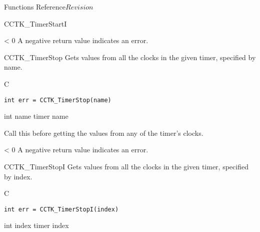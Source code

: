 \begin{cactuspart}{ Functions Reference}{}{$Revision$}
\begin{FunctionDescription}{CCTK\_TimerStartI}
\begin{ErrorSection}
\begin{Error}{< 0}
A negative return value indicates an error.
\end{Error}
\end{ErrorSection}
\end{FunctionDescription}

\begin{FunctionDescription}{CCTK\_TimerStop}
\label{CCTK-TimerStop}
Gets values from all the clocks in the
given timer, specified by name.

\begin{SynopsisSection}
\begin{Synopsis}{C}
\begin{verbatim}
int err = CCTK_TimerStop(name)
\end{verbatim}
\end{Synopsis}
\end{SynopsisSection}

\begin{ParameterSection}
\begin{Parameter} {int name}
timer name
\end{Parameter}
\end{ParameterSection}

\begin{Discussion}
Call this before getting the values from any of the timer's clocks.
\end{Discussion}

\begin{ErrorSection}
\begin{Error}{< 0}
A negative return value indicates an error.
\end{Error}
\end{ErrorSection}
\end{FunctionDescription}

\begin{FunctionDescription}{CCTK\_TimerStopI}
\label{CCTK-TimerStopI}
Gets values from all the clocks in the
given timer, specified by index.

\begin{SynopsisSection}
\begin{Synopsis}{C}
\begin{verbatim}
int err = CCTK_TimerStopI(index)
\end{verbatim}
\end{Synopsis}
\end{SynopsisSection}

\begin{ParameterSection}
\begin{Parameter} {int index}
timer index
\end{Parameter}
\end{ParameterSection}


\end{FunctionDescription}
\end{cactuspart}
